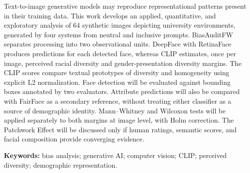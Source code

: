 Text-to-image generative models may reproduce representational patterns present in their training data. This work develops an applied, quantitative, and exploratory analysis of 64 synthetic images depicting university environments, generated by four systems from neutral and inclusive prompts. BiasAuditFW separates processing into two observational units. DeepFace with RetinaFace produces predictions for each detected face, whereas CLIP estimates, once per image, perceived racial diversity and gender-presentation diversity margins. The CLIP scores compare textual prototypes of diversity and homogeneity using explicit L2 normalization. Face detection will be evaluated against bounding boxes annotated by two evaluators. Attribute predictions will also be compared with FairFace as a secondary reference, without treating either classifier as a source of demographic identity. Mann--Whitney and Wilcoxon tests will be applied separately to both margins at image level, with Holm correction. The Patchwork Effect will be discussed only if human ratings, semantic scores, and facial composition provide converging evidence.

\noindent\textbf{Keywords:} bias analysis; generative AI; computer vision; CLIP; perceived diversity; demographic representation.

